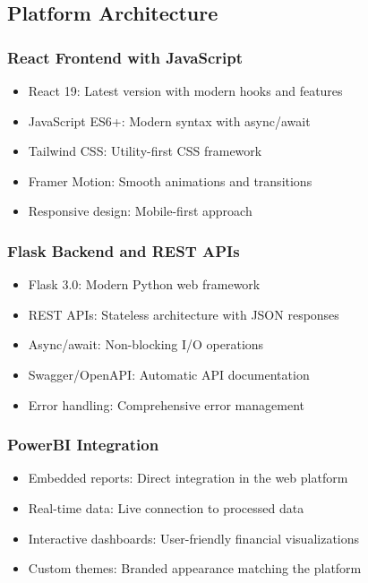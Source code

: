 \documentclass[12pt,a4paper]{article}
\begin{document}
\subsection{Platform Architecture}
\subsubsection{React Frontend with JavaScript}
\begin{itemize}
    \item React 19: Latest version with modern hooks and features
    \item JavaScript ES6+: Modern syntax with async/await
    \item Tailwind CSS: Utility-first CSS framework
    \item Framer Motion: Smooth animations and transitions
    \item Responsive design: Mobile-first approach
\end{itemize}

\subsubsection{Flask Backend and REST APIs}
\begin{itemize}
    \item Flask 3.0: Modern Python web framework
    \item REST APIs: Stateless architecture with JSON responses
    \item Async/await: Non-blocking I/O operations
    \item Swagger/OpenAPI: Automatic API documentation
    \item Error handling: Comprehensive error management
\end{itemize}

\subsubsection{PowerBI Integration}
\begin{itemize}
    \item Embedded reports: Direct integration in the web platform
    \item Real-time data: Live connection to processed data
    \item Interactive dashboards: User-friendly financial visualizations
    \item Custom themes: Branded appearance matching the platform
\end{itemize}
\end{document}
